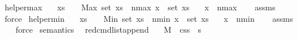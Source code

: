 \begin{isabellebody}
\isamarkupfalse%
%
\endisatagproof
{\isafoldproof}%
%
\isadelimproof
\isanewline
%
\endisadelimproof
\isanewline
{}\isamarkupfalse%
\ helper{\isacharunderscore}{\kern0pt}max{\isacharcolon}{\kern0pt}\isanewline
\ \ \ {\isachardoublequoteopen}xs\ {\isasymnoteq}\ {\isacharbrackleft}{\kern0pt}{\isacharbrackright}{\kern0pt}\ {\isasymLongrightarrow}\ Max\ {\isacharparenleft}{\kern0pt}set\ xs{\isacharparenright}{\kern0pt}\ {\isasymle}\ n{\isacharunderscore}{\kern0pt}max{\isachardoublequoteclose}\ {\isachardoublequoteopen}x\ {\isasymin}\ set\ xs{\isachardoublequoteclose}\isanewline
\ \ \ {\isachardoublequoteopen}x\ {\isasymle}\ n{\isacharunderscore}{\kern0pt}max{\isachardoublequoteclose}\isanewline
%
\isadelimproof
\ \ %
\endisadelimproof
%
\isatagproof
{}\isamarkupfalse%
\ assms\isanewline
\ \ \isamarkupfalse%
\ force%
\endisatagproof
{\isafoldproof}%
%
\isadelimproof
\isanewline
%
\endisadelimproof
\isanewline
{}\isamarkupfalse%
\ helper{\isacharunderscore}{\kern0pt}min{\isacharcolon}{\kern0pt}\isanewline
\ \ \ {\isachardoublequoteopen}xs\ {\isasymnoteq}\ {\isacharbrackleft}{\kern0pt}{\isacharbrackright}{\kern0pt}\ {\isasymLongrightarrow}\ Min\ {\isacharparenleft}{\kern0pt}set\ xs{\isacharparenright}{\kern0pt}\ {\isasymge}\ n{\isacharunderscore}{\kern0pt}min{\isachardoublequoteclose}\ {\isachardoublequoteopen}x\ {\isasymin}\ set\ xs{\isachardoublequoteclose}\isanewline
\ \ \ {\isachardoublequoteopen}x\ {\isasymge}\ n{\isacharunderscore}{\kern0pt}min{\isachardoublequoteclose}\isanewline
%
\isadelimproof
\ \ %
\endisadelimproof
%
\isatagproof
{}\isamarkupfalse%
\ assms\isanewline
\ \ \isamarkupfalse%
\ force%
\endisatagproof
{\isafoldproof}%
%
\isadelimproof
\isanewline
%
\endisadelimproof
\isanewline
\isanewline
{}\isamarkupfalse%
\ semantics\ \isanewline
\isanewline
{}\isamarkupfalse%
\ red{\isacharunderscore}{\kern0pt}cmd{\isacharunderscore}{\kern0pt}list{\isacharunderscore}{\kern0pt}append{\isacharcolon}{\kern0pt}\isanewline
\ \ \ {\isachardoublequoteopen}M{\isacharcomma}{\kern0pt}{\isasymLambda}{\isacharcomma}{\kern0pt}{\isasymGamma}{\isacharcomma}{\kern0pt}{\isasymOmega}\ {\isasymturnstile}\ {\isasymlangle}cs{}{\isacharcomma}{\kern0pt}s{\isasymrangle}\ {\isacharbrackleft}{\kern0pt}{\isasymrightarrow}{\isacharbrackright}{\kern0pt}\ s{\isacharprime}{\kern0pt}{\isacharprime}{\kern0pt}{\isachardoublequoteclose}\ \isanewline

\end{isabellebody}
